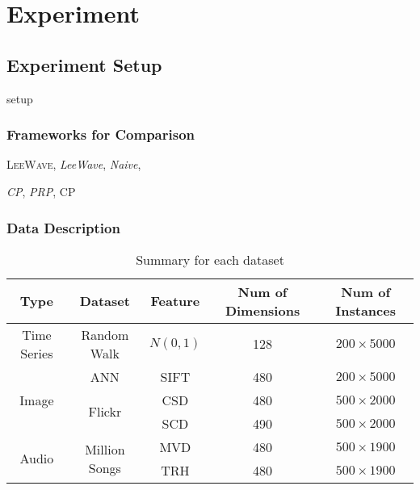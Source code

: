 \chapter{Experiment}
\label{c:exp}

\section{Experiment Setup} %
\label{s:experiment_setup}
setup~

\subsection{Frameworks for Comparison} %
\label{sub:frameworks_for_comparison}


\textsc{LeeWave},
\emph{LeeWave},
\emph{Naive},

\emph{CP},
\emph{PRP},
\textsc{CP}


\subsection{Data Description} %
\label{ss:data_description}

\begin{table}[htpb]\begin{center}
\caption{Summary for each dataset}
\begin{tabular}{|c|c|c|c|c|}
\hline 
Type & Dataset & Feature & Num of Dimensions & Num of Instances\\ \hline \hline
Time Series & Random Walk & $N(0,1)$ & 128 & $200\times 5000$\\ \hline
\multirow{3}{*}{Image} & ANN & SIFT & 480 & $200\times 5000$\\ 
\cline{2-5}
 & \multirow{2}{*}{Flickr} & CSD & 480 & $500\times 2000$\\ 
 & & SCD & 490 & $500\times 2000$\\ \hline
 \multirow{2}{*}{Audio} & \multirow{2}{*}{Million Songs} & MVD & 480 & $500\times 1900$ \\ 
 \cline{3-5}
 & & TRH & 480 & $500\times 1900$\\ \hline
\end{tabular}
\end{center}\end{table}




